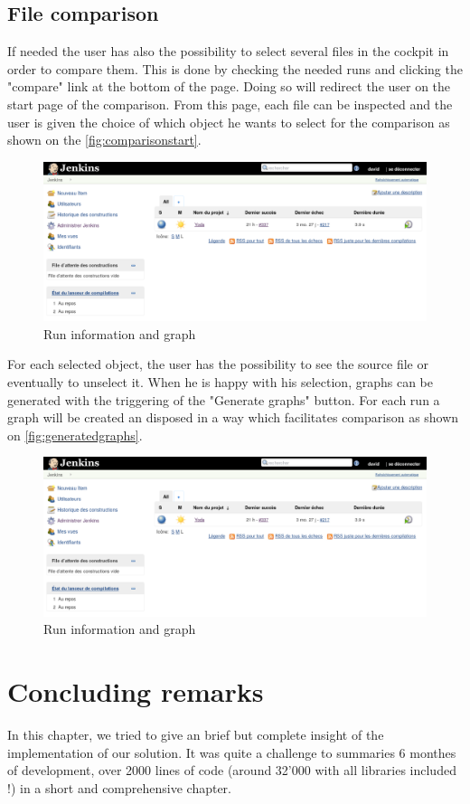 \subsection{File comparison}
If needed the user has also the possibility to select several files in the cockpit in order to compare them. This is done by checking the needed runs and clicking the "compare" link at the bottom of the page. Doing so will redirect the user on the start page of the comparison. From this page, each file can be inspected and the user is given the choice of which object he wants to select for the comparison as shown on the \autoref{fig:comparisonstart}.
\begin{figure}[h!]
  \centering
    \includegraphics[width=\textwidth]{figures/jenkins.png}
    \caption{Run information and graph}
    \label{fig:comparisonstart}
\end{figure}

For each selected object, the user has the possibility to see the source file or eventually to unselect it. When he is happy with his selection, graphs can be generated with the triggering of the "Generate graphs" button. For each run a graph will be created an disposed in a way which facilitates comparison as shown on \autoref{fig:generatedgraphs}.
\begin{figure}[h!]
  \centering
    \includegraphics[width=\textwidth]{figures/jenkins.png}
    \caption{Run information and graph}
    \label{fig:generatedgraphs}
\end{figure}


\section{Concluding remarks}
In this chapter, we tried to give an brief but complete insight of the implementation of our solution. It was quite a challenge to summaries 6 monthes of development, over 2000 lines of code (around 32'000 with all libraries included !) in a short and comprehensive chapter.

